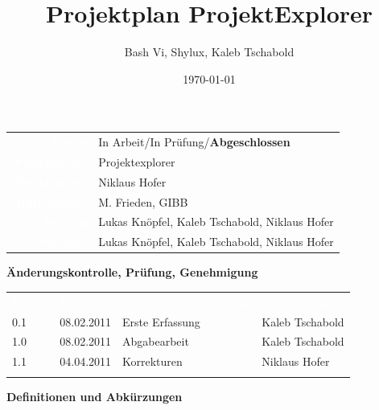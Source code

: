 \documentclass[10pt,paper=a4,final]{scrartcl}
\title{Projektplan ProjektExplorer}
\author{Bash Vi, Shylux, Kaleb Tschabold}
\date{\today}
\begin{document}
\maketitle
\newpage
\begin{tabularx}{\textwidth}{ r X }	%
  \textcolor{white}{{\bf Status}}\cellcolor{blue!80!} &  In Arbeit/In Pr\"ufung/{\bf Abgeschlossen}\cellcolor{blue!20!} \\
\textcolor{white}{{\bf Projektname}}\cellcolor{blue!80!} & Projektexplorer\cellcolor{blue!20!} \\
\textcolor{white}{{\bf Projektleiter}}\cellcolor{blue!80!} & Niklaus Hofer\cellcolor{blue!20!} \\
\textcolor{white}{{\bf Auftraggeber}}\cellcolor{blue!80!} & M. Frieden, GIBB\cellcolor{blue!20!} \\
\textcolor{white}{{\bf Autoren}}\cellcolor{blue!80!} & Lukas Knöpfel, Kaleb Tschabold, Niklaus Hofer\cellcolor{blue!20!} \\
\textcolor{white}{{\bf Verteiler}}\cellcolor{blue!80!} & Lukas Knöpfel, Kaleb Tschabold, Niklaus Hofer\cellcolor{blue!20!}
\end{tabularx}
\newline
\newline
\newline
{\bf \"Anderungskontrolle, Pr\"ufung, Genehmigung}
\newline

\begin{tabularx}{\textwidth}{l l X X}
\textcolor{white}{Version}\cellcolor{blue!80!} & \textcolor{white}{Datum}\cellcolor{blue!80!} & \textcolor{white}{Beschreibung, Bemerkung}\cellcolor{blue!80!} & \textcolor{white}{Name oder Rolle}\cellcolor{blue!80!} \\
\cellcolor{blue!20!} 0.1 & \cellcolor{blue!20!} 08.02.2011 & \cellcolor{blue!20!} Erste Erfassung & \cellcolor{blue!20!} Kaleb Tschabold \\
\cellcolor{blue!20!} 1.0 & \cellcolor{blue!20!} 08.02.2011 & \cellcolor{blue!20!} Abgabearbeit & \cellcolor{blue!20!} Kaleb Tschabold \\
\cellcolor{blue!20!} 1.1 & \cellcolor{blue!20!} 04.04.2011 & \cellcolor{blue!20!} Korrekturen & \cellcolor{blue!20!} Niklaus Hofer\\
\cellcolor{blue!20!} & \cellcolor{blue!20!} & \cellcolor{blue!20!} & \cellcolor{blue!20!} \\
\end{tabularx}
\newline
\newline
\newline
{\bf Definitionen und Abk\"urzungen}
\newline
\end{document}
